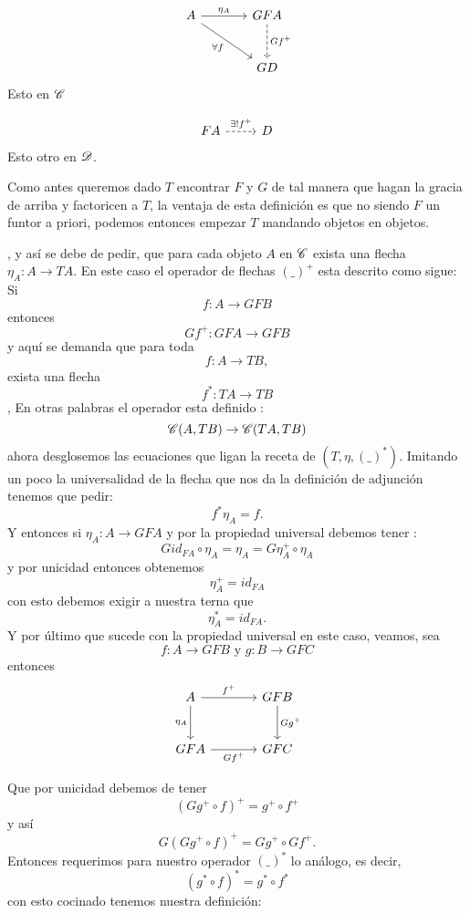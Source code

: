 \documentclass{comunicaciones}
\begin{document}
\[
\begin{tikzcd}[column sep=large, row sep=large]
    A \arrow[r, "\eta_{A}", name=eta] \arrow[dr, "\forall f"', name=forallf] & GFA \arrow[d, dashed, "Gf^{+}", name=gfplus] \\
    & GD
\end{tikzcd}
\]
Esto en $\mathscr C$

  \[
\begin{tikzcd}
  FA \arrow[r, dashed, "\exists! f^+"] & D
\end{tikzcd}
\]
Esto otro en $\mathscr D$.

Como antes queremos dado $T$ encontrar $F$ y $G$ de tal manera que hagan la gracia de arriba y factoricen a $T$, la ventaja de esta definición es que no siendo $F$ un funtor a priori, podemos entonces empezar $T$ mandando objetos en objetos.

, y así se debe de pedir, que para cada objeto $A$ en $\mathscr C$ exista una flecha $\eta_{A}\colon A\rightarrow TA$. En este caso el operador de flechas $(\_)^{+}$ esta descrito como sigue: Si \[f\colon A\rightarrow GFB\] entonces
 \[Gf^{+}\colon GFA\rightarrow GFB\] y aquí se demanda que para toda \[f\colon A\rightarrow TB,\] exista una flecha \[f^{*}\colon TA\rightarrow TB\], En otras palabras el operador esta definido :
 \[\mathscr C(A,TB)\rightarrow\mathscr C(TA,TB)\] ahora desglosemos las ecuaciones que ligan la receta de $(T,\eta,(\_)^{*})$.
 Imitando un poco la universalidad de la flecha que nos da la definición de adjunción tenemos que pedir:
 \[f^{*}\eta_{A}=f.\] 
 Y entonces si $\eta_{A}\colon A\rightarrow GFA$ y por la propiedad universal debemos tener :\[Gid_{FA}\circ\eta_{A}=\eta_{A}=G\eta^{+}_{A}\circ\eta_{A}\]
  y por unicidad entonces obtenemos \[\eta^{+}_{A}=id_{FA}\] con esto debemos exigir a nuestra terna que \[\eta^{*}_{A}=id_{FA}.\]
  Y por último que sucede con la propiedad universal en este caso, veamos, sea \[f\colon A\rightarrow GFB\text{ y } g\colon B\rightarrow GFC\] entonces 
  \[\begin{tikzcd}[column sep=large, row sep=large]
    A \arrow[r, "f^+"] \arrow[d, "\eta_A"'] & GFB \arrow[d, "Gg^+"] \\
    GFA \arrow[r, "Gf^+"'] & GFC
    \end{tikzcd}\]


Que por unicidad debemos de tener \[(Gg^{+}\circ f)^{+}=g^{+}\circ f^{+}\] y así \[G(Gg^{+}\circ f)^{+}=Gg^{+}\circ Gf^{+}.\] Entonces requerimos para nuestro operador $(\_)^{*}$ lo análogo, es decir, \[(g^{*}\circ f)^{*}=g^{*}\circ f^{*}\]
con esto cocinado tenemos nuestra definición:
\end{document}
